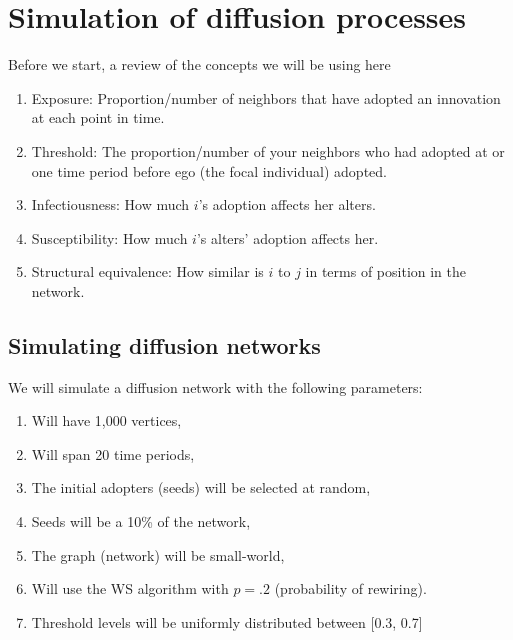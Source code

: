 \documentclass[]{book}
\providecommand{\tightlist}{%
  \setlength{\itemsep}{0pt}\setlength{\parskip}{0pt}}
\begin{document}
\hypertarget{simulation-of-diffusion-processes}{%
\section{Simulation of diffusion processes}\label{simulation-of-diffusion-processes}}

Before we start, a review of the concepts we will be using here

\begin{enumerate}
\def\labelenumi{\arabic{enumi}.}
\tightlist
\item
  Exposure: Proportion/number of neighbors that have adopted an innovation at each point in time.
\item
  Threshold: The proportion/number of your neighbors who had adopted at or one time period before ego (the focal individual) adopted.
\item
  Infectiousness: How much \(i\)'s adoption affects her alters.
\item
  Susceptibility: How much \(i\)'s alters' adoption affects her.
\item
  Structural equivalence: How similar is \(i\) to \(j\) in terms of position in the network.
\end{enumerate}

\hypertarget{simulating-diffusion-networks}{%
\subsection{Simulating diffusion networks}\label{simulating-diffusion-networks}}

We will simulate a diffusion network with the following parameters:

\begin{enumerate}
\def\labelenumi{\arabic{enumi}.}
\tightlist
\item
  Will have 1,000 vertices,
\item
  Will span 20 time periods,
\item
  The initial adopters (seeds) will be selected at random,
\item
  Seeds will be a 10\% of the network,
\item
  The graph (network) will be small-world,
\item
  Will use the WS algorithm with \(p=.2\) (probability of rewiring).
\item
  Threshold levels will be uniformly distributed between {[}0.3, 0.7{]}
\end{enumerate}
\end{document}
